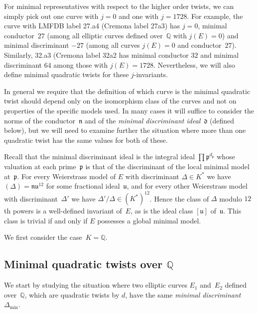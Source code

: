 \documentclass{article}
\def\Q{{\mathbb Q}}
\def\d{{\mathfrak d}}
\def\n{{\mathfrak n}}
\def\p{{\mathfrak p}}
\def\u{{\mathfrak u}}
\begin{document}
For minimal representatives with respect to the higher order twists,
we can simply pick out one curve with $j=0$ and one with $j=1728$. For
example, the curve with LMFDB label 27.a4 (Cremona label 27a3) has
$j=0$, minimal conductor~$27$ (among all elliptic curves defined
over~$\Q$ with $j(E)=0$) and minimal discriminant $-27$ (among all
curves $j(E)=0$ and conductor~$27$).  Similarly, 32.a3 (Cremona label
32a2 has minimal conductor $32$ and minimal discriminant $64$ among
those with $j(E)=1728$.  Nevertheless, we will also define minimal
quadratic twists for these $j$-invariants.

In general we require that the definition of which curve is the
minimal quadratic twist should depend only on the isomorphism class of
the curves and not on properties of the specific models used.  In many
cases it will suffice to consider the norms of the conductor~$\n$ and
of the \textit{minimal discriminant ideal}~$\d$ (defined below), but
we will need to examine further the situation where more than one
quadratic twist has the same values for both of these.

Recall that the minimal discriminant ideal is the integral ideal
$\prod\p^{d_{\p}}$ whose valuation at each prime~$\p$ is that of the
discriminant of the local minimal model at~$\p$.  For every
Weierstrass model of $E$ with discriminant $\Delta\in K^*$ we have
$(\Delta)=\n\u^{12}$ for some fractional ideal~$\u$, and for every
other Weierstrass model with discriminant~$\Delta'$ we have
$\Delta'/\Delta\in (K^*)^{12}$.  Hence the class of $\Delta$ modulo
$12$th powers is a well-defined invariant of~$E$, as is the ideal
class $[\u]$ of~$\u$.  This class is trivial if and only if $E$
possesses a global minimal model.

We first consider the case~$K=\Q$.

\subsection{Minimal quadratic twists over \texorpdfstring{$\Q$}{\textbf Q}}

We start by studying the situation where two elliptic curves $E_1$
and~$E_2$ defined over~$\Q$, which are quadratic twists by $d$, have
the same \textit{minimal discriminant}~$\Delta_{\text{min}}$.
\end{document}
